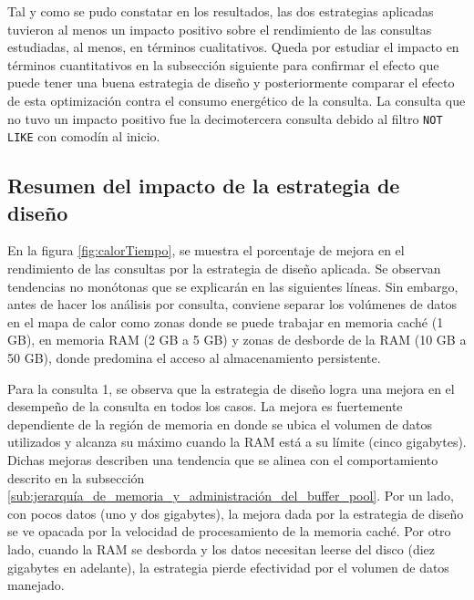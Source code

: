 \documentclass[12pt, letter paper]{report}
\begin{document}
        Tal y como se pudo constatar en los resultados, las dos estrategias
        aplicadas tuvieron al menos un impacto positivo sobre el rendimiento de
        las consultas estudiadas, al menos, en términos cualitativos. Queda por
        estudiar el impacto en términos cuantitativos en la subsección siguiente
        para confirmar el efecto que puede tener una buena estrategia de diseño
        y posteriormente comparar el efecto de esta optimización contra el
        consumo energético de la consulta. La consulta que no tuvo un impacto
        positivo fue la decimotercera consulta debido al filtro \texttt{NOT
        LIKE} con comodín al inicio.

      \subsection{Resumen del impacto de la estrategia de diseño} %
      \label{sub:resumen_del_impacto_de_la_estrategia_de_diseño}
        En la figura \ref{fig:calorTiempo}, se muestra el porcentaje de mejora
        en el rendimiento de las consultas por la estrategia de diseño aplicada.
        Se observan tendencias no monótonas que se explicarán en las siguientes
        líneas. Sin embargo, antes de hacer los análisis por consulta, conviene
        separar los volúmenes de datos en el mapa de calor como zonas donde se
        puede trabajar en memoria caché (1 GB), en memoria RAM (2 GB a 5 GB) y
        zonas de desborde de la RAM (10 GB a 50 GB), donde predomina el acceso
        al almacenamiento persistente.

        Para la consulta 1, se observa que la estrategia de diseño logra una
        mejora en el desempeño de la consulta en todos los casos. La mejora es
        fuertemente dependiente de la región de memoria en donde se ubica el
        volumen de datos utilizados y alcanza su máximo cuando la RAM está a su
        límite (cinco gigabytes). Dichas mejoras describen una tendencia que se
        alinea con el comportamiento descrito en la subsección
        \ref{sub:jerarquía_de_memoria_y_administración_del_buffer_pool}. Por un
        lado, con pocos datos (uno y dos gigabytes), la mejora dada por la
        estrategia de diseño se ve opacada por la velocidad de procesamiento de
        la memoria caché. Por otro lado, cuando la RAM se desborda y los datos
        necesitan leerse del disco (diez gigabytes en adelante), la estrategia
        pierde efectividad por el volumen de datos manejado.
\end{document}
